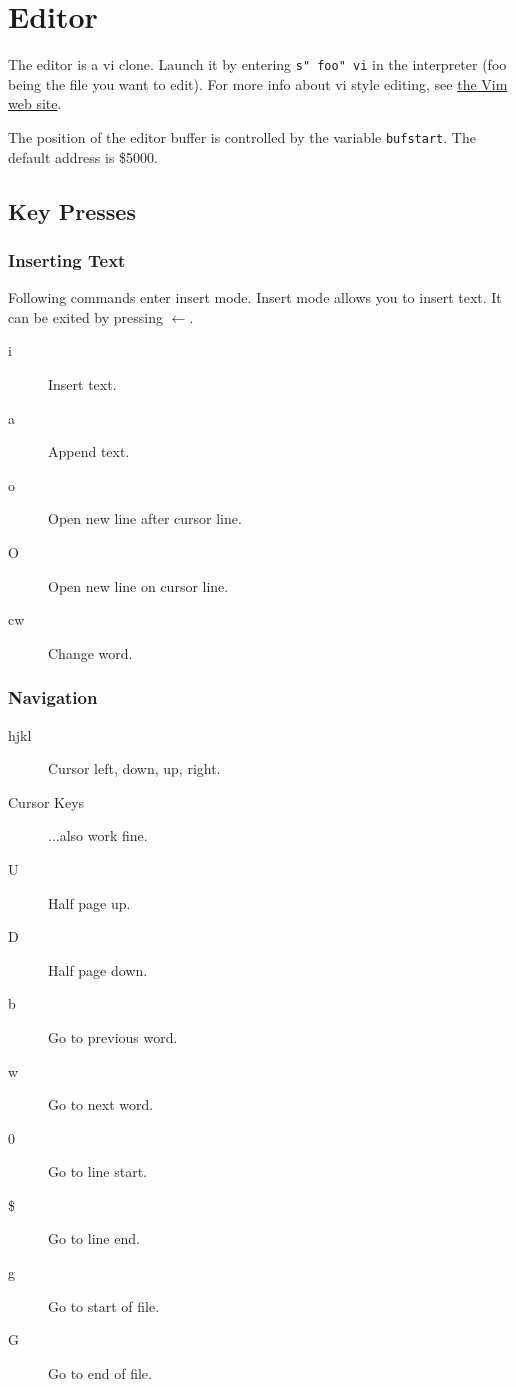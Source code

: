 \chapter{Editor} \label{editor}

The editor is a vi clone. Launch it by entering \texttt{s" foo" vi} in the interpreter (foo being the file you want to edit). For more info about vi style editing, see \href{http://www.vim.org}{the Vim web site}.

The position of the editor buffer is controlled by the variable \texttt{bufstart}. The default address is \$5000.

\section{Key Presses}

\subsection{Inserting Text}
Following commands enter insert mode. Insert mode allows you to insert text. It can be exited by pressing $\leftarrow$.
\begin{description}
\item[i] Insert text.
\item[a] Append text.
\item[o] Open new line after cursor line.
\item[O] Open new line on cursor line.
\item[cw] Change word.
\end{description}

\subsection{Navigation}
\begin{description}
\item[hjkl] Cursor left, down, up, right.
\item[Cursor Keys] ...also work fine.
\item[U] Half page up.
\item[D] Half page down.
\item[b] Go to previous word.
\item[w] Go to next word.
\item[0] Go to line start.
\item[\$] Go to line end.
\item[g] Go to start of file.
\item[G] Go to end of file.
\end{description}

